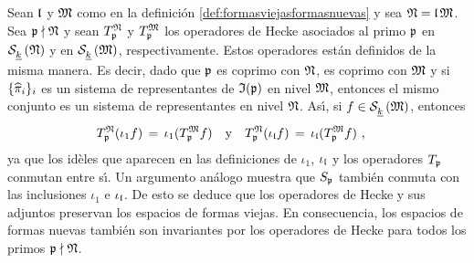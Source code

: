 Sean $\frak{l}$ y $\frak{M}$ como en la definici\'{o}n
\ref{def:formasviejasformasnuevas} y sea $\frak{N}=\frak{l}\,\frak{M}$. Sea
$\frak{p}\nmid\frak{N}$ y sean $T_{\frak{p}}^{\frak{N}}$ y
$T_{\frak{p}}^{\frak{M}}$ los operadores de Hecke asociados al primo $\frak{p}$
en $\spitzH{k}{\frak{N}}$ y en $\spitzH{k}{\frak{M}}$, respectivamente. Estos
operadores est\'{a}n definidos de la misma manera. Es decir, dado que
$\frak{p}$ es coprimo con $\frak{N}$, es coprimo con $\frak{M}$ y si
$\{\hhat{\pi}_{i}\}_{i}$ es un sistema de representantes de
$\frak{I}(\frak{p})$ en nivel $\frak{M}$, entonces el mismo conjunto es un
sistema de representantes en nivel $\frak{N}$. As\'{\i}, si
$f\in\spitzH{k}{\frak{M}}$, entonces
\begin{align*}
	T_{\frak{p}}^{\frak{N}}(\iota_{1}f) \,=\,
		\iota_{1}(T_{\frak{p}}^{\frak{M}}f) & \quad\text{y}\quad
	T_{\frak{p}}^{\frak{N}}(\iota_{\frak{l}}f) \,=\,
		\iota_{\frak{l}}(T_{\frak{p}}^{\frak{M}}f)
	\text{ ,}
\end{align*}
%
ya que los id\`{e}les que aparecen en las definiciones de $\iota_{1}$,
$\iota_{\frak{l}}$ y los operadores $T_{\frak{p}}$ conmutan entre s\'{\i}. Un
argumento an\'{a}logo muestra que $S_{\frak{p}}$ tambi\'{e}n conmuta con las
inclusiones $\iota_{1}$ e $\iota_{\frak{l}}$. De esto se deduce que los
operadores de Hecke y sus adjuntos preservan los espacios de formas viejas. En
consecuencia, los espacios de formas nuevas tambi\'{e}n son invariantes por los
operadores de Hecke para todos los primos $\frak{p}\nmid\frak{N}$.

